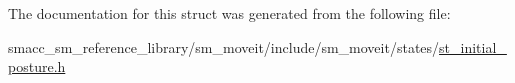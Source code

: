 The documentation for this struct was generated from the following file\+:\begin{DoxyCompactItemize}
\item 
smacc\+\_\+sm\+\_\+reference\+\_\+library/sm\+\_\+moveit/include/sm\+\_\+moveit/states/\hyperlink{sm__moveit_2include_2sm__moveit_2states_2st__initial__posture_8h}{st\+\_\+initial\+\_\+posture.\+h}\end{DoxyCompactItemize}
